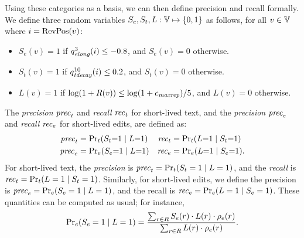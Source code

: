 
\newcommand{\textmass}{\rho_t}
\newcommand{\editmass}{\rho_e} 
\newcommand{\specq}{\alpha}
\newcommand{\especq}{\alpha_e}
\newcommand{\tspecq}{\alpha_t}
\newcommand{\repu}{{\text{\textit{rep}}}}
\def\eqpun{\;}
\newcommand{\prece}{{\text{\textit{prec}}}_e}
\newcommand{\prect}{{\text{\textit{prec}}}_t}
\newcommand{\recall}{{\text{\textit{rec}}}}
\newcommand{\recalle}{{\text{\textit{rec}}}_e}
\newcommand{\recallt}{{\text{\textit{rec}}}_t}
\newcommand{\boost}{{\text{\textit{boost}}}}
\newcommand{\booste}{{\text{\textit{boost}}}_e}
\newcommand{\boostt}{{\text{\textit{boost}}}_t}
\newcommand{\constraint}{\kappa}
\newcommand{\constrainte}{\kappa_e}
\newcommand{\constraintt}{\kappa_t}

Using these categories as a basis, we can then define precision
and recall formally.
We define three random variables $S_e, S_t, L: \versions{}
\mapsto \set{0,1}$ as follows, for all $v \in \versions{}$ where
$i = \mathrm{RevPos}(v)$:
%
\begin{itemize} 

\item $S_e(v)=1$ if $\quality{elong}{3}{i} \leq -0.8$, and $S_e(v)=0$ otherwise.
\item $S_t(v)=1$ if $\quality{tdecay}{10}{i} \leq  0.2$, and $S_t(v)=0$ otherwise.
\item $L(v)=1$ if $\log (1+R(v)) \leq \log(1+{c_{{\text{\textit{maxrep}}}}}) / 5$,
  and $L(v)=0$ otherwise.

\end{itemize}
%
\iflong
The {\em precision\/} $\prect$ and {\em recall\/} $\recallt$
for short-lived text, and 
the {\em precision\/} $\prece$ and {\em recall\/} $\recalle$
for short-lived edits, are defined as:
%
\begin{align*}
    \prect & = \textstyle\Pr_t(S_t{=}1 \mid L{=}1) 
  & \recallt & = \textstyle\Pr_t(L{=}1 \mid S_t{=}1) \\
    \prece & = \textstyle\Pr_e(S_e{=}1 \mid L{=}1) 
  & \recalle & = \textstyle\Pr_e(L{=}1 \mid S_e{=}1).
\end{align*}
\fi
\ifshort
For short-lived text, the {\em precision\/} is 
$
  \textstyle \prect = \Pr_t(S_t=1 \mid L=1)
$,
and the {\em recall\/} is 
$
  \textstyle \recallt = \Pr_t(L=1 \mid S_t=1)
$.
Similarly, for short-lived edits, we define the 
precision is $\prece = \Pr_e(S_e=1 \mid L=1)$, 
and the recall is $\recalle = \Pr_e(L=1 \mid S_e=1)$.
\fi
These quantities can be computed as usual; for instance, 
\[
  {\textstyle \Pr_e} (S_e=1 \mid L=1) = 
  \frac{\sum_{r \in R} S_e(r) \cdot L(r) \cdot \editmass(r)}{%
    \sum_{r \in R} L(r) \cdot \editmass(r)}.
\]


